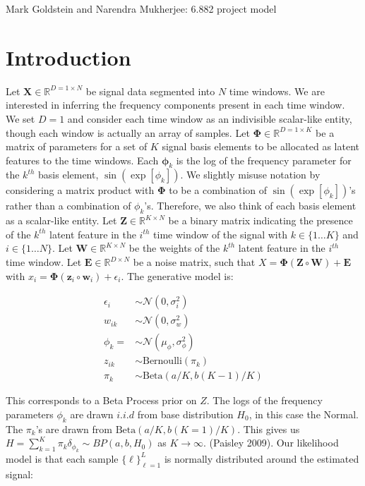 \documentclass[11pt]{article}
\theoremstyle{definition}
\theoremstyle{plain}
\newcommand{\Beta}{\text{Beta}}
\newcommand{\Bernoulli}{\text{Bernoulli}}
\begin{document}
\begin{center}
Mark Goldstein and Narendra Mukherjee: 6.882 project model 
\end{center}
\section{Introduction}

\noindent Let $\mathbf{X} \in \mathbb{R}^{D=1 \times N}$ be signal data segmented into
$N$ time windows. We are interested in inferring the frequency components present in each time window. 
We set $D=1$ and consider each time window as an indivisible scalar-like entity, though each window is 
actually an array of samples. Let $\mathbf{\Phi} \in \mathbb{R}^{D=1 \times K}$ be a matrix of 
parameters for a set of $K$ signal basis elements to be allocated as latent features to the time windows.
Each $\mathbf{\phi}_k$ is the log of the frequency parameter for the $k^{th}$ basis element, 
$\sin(\exp[\phi_k])$. We slightly misuse notation by considering a matrix product with 
$\boldsymbol{\Phi}$ to be a combination of $\sin(\exp[\phi_k])$'s rather than a combination 
of $\phi_k$'s. Therefore, we also think of each basis element as a scalar-like entity. 
Let $\mathbf{Z} \in \mathbb{R}^{K \times N}$ be a binary matrix 
indicating the presence of the $k^{th}$ latent feature in the $i^{th}$ time window of the signal 
with $k \in \{1 \ldots K\}$ and $i \in \{1 \ldots N\}$. Let $\mathbf{W} \in \mathbb{R}^{K \times N}$ 
be the weights of the $k^{th}$ latent feature in the $i^{th}$ time window. Let $\mathbf{E} 
\in \mathbb{R}^{D \times N}$ be a noise matrix, such that $X = \mathbf{\Phi}(\mathbf{Z} \circ 
\mathbf{W}) + \mathbf{E}$ with $x_i = \mathbf{\Phi}(\mathbf{z}_i \circ \mathbf{w}_i) + \epsilon_i$. 
The generative model is:

\begin{align*}
    \epsilon_i &\sim \mathcal{N}(0, \sigma^2_i)\\
    w_{ik} &\sim \mathcal{N}(0, \sigma^2_w)\\
    \phi_k = &\sim \mathcal{N}(\mu_{\phi}, \sigma^2_{\phi})\\
    z_{ik} &\sim \Bernoulli(\pi_k)\\
    \pi_k &\sim \Beta(a/K, b(K-1)/K)
\end{align*}

\noindent This corresponds to a Beta Process prior on $Z$. The logs of the frequency parameters 
$\phi_k$ are drawn $i.i.d$ from base distribution $H_0$, in this case the Normal.
The $\pi_k$'s are drawn from $\Beta(a/K,b(K=1)/K)$. This gives us $H = \sum_{k=1}^K \pi_k \delta_{\phi_k} \sim BP(a,b,H_0)$ as $K \rightarrow \infty$. (Paisley 2009). 
Our likelihood model is that each sample $\{\ell\}_{\ell=1}^L$ is normally distributed around the estimated signal:
\end{document}
